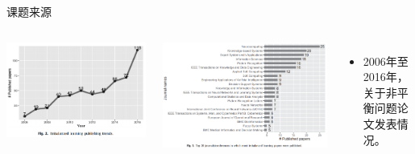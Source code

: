 \documentclass{beamer}
\begin{document}
\begin{frame}{课题来源}\pause
        \begin{columns}
            \begin{minipage}[c][0.4\textheight][c]{\linewidth}
                \centering
                \includegraphics[scale=0.2]{trend.png}
            \end{minipage}

            \begin{minipage}[c][0.4\textheight][c]{\linewidth}
                \centering
                \includegraphics[scale=0.2]{top20.png}
            \end{minipage}
            
            \begin{minipage}[c][0.4\textheight][c]{\linewidth}
                \begin{itemize}
                    \item 2006年至2016年，关于非平衡问题论文发表情况。
                \end{itemize}
                

\end{minipage}
\end{columns}
\end{frame}
\end{document}
